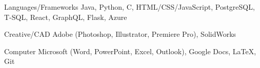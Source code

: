 
\begin{cvskills}
  \cvskill
  {Languages/Frameworks} %
  {Java, Python, C, HTML/CSS/JavaScript, PostgreSQL, T-SQL, React, GraphQL, Flask, Azure} %

  \cvskill
  {Creative/CAD} %
  {Adobe (Photoshop, Illustrator, Premiere Pro), SolidWorks} %

  \cvskill
  {Computer} %
  {Microsoft (Word, PowerPoint, Excel, Outlook), Google Docs, LaTeX, Git} %
\end{cvskills}
